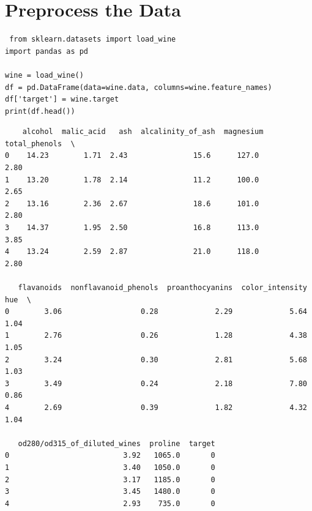 \vspace{-.75cm}
\section{ Preprocess the Data}
\vspace{-.6cm}
\begin{code}
\begin{lstlisting}
 from sklearn.datasets import load_wine
import pandas as pd

wine = load_wine()
df = pd.DataFrame(data=wine.data, columns=wine.feature_names)
df['target'] = wine.target
print(df.head())
\end{lstlisting}
\end{code}
\vspace{-.75cm}
\begin{verbatim}
    alcohol  malic_acid   ash  alcalinity_of_ash  magnesium  total_phenols  \
0    14.23        1.71  2.43               15.6      127.0           2.80   
1    13.20        1.78  2.14               11.2      100.0           2.65   
2    13.16        2.36  2.67               18.6      101.0           2.80   
3    14.37        1.95  2.50               16.8      113.0           3.85   
4    13.24        2.59  2.87               21.0      118.0           2.80   

   flavanoids  nonflavanoid_phenols  proanthocyanins  color_intensity   hue  \
0        3.06                  0.28             2.29             5.64  1.04   
1        2.76                  0.26             1.28             4.38  1.05   
2        3.24                  0.30             2.81             5.68  1.03   
3        3.49                  0.24             2.18             7.80  0.86   
4        2.69                  0.39             1.82             4.32  1.04   

   od280/od315_of_diluted_wines  proline  target  
0                          3.92   1065.0       0  
1                          3.40   1050.0       0  
2                          3.17   1185.0       0  
3                          3.45   1480.0       0  
4                          2.93    735.0       0
\end{verbatim}
\vspace{-.75cm}
